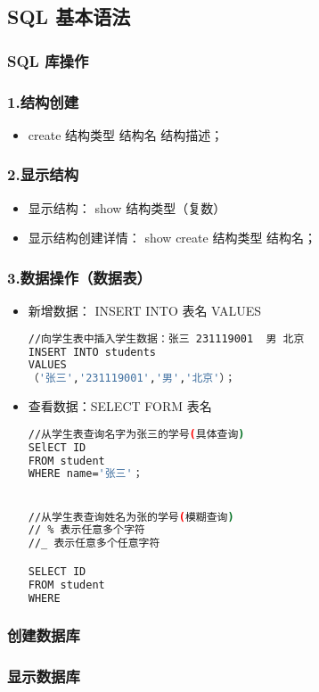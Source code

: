 
\begin{issues}
\issueDraft
\end{issues}

\subsection{SQL 基本语法}

\subsubsection{SQL 库操作}
\subsubsection{1.结构创建}
\begin{itemize}
\item create 结构类型 结构名 结构描述；
\end{itemize}
\subsubsection{2.显示结构}
\begin{itemize}
\item 显示结构： show 结构类型（复数）
\item 显示结构创建详情： show create 结构类型 结构名；
\end{itemize}
\subsubsection{3.数据操作（数据表）}
\begin{itemize}
\item 新增数据： INSERT INTO 表名 VALUES
\begin{lstlisting}[language=bash]
//向学生表中插入学生数据：张三 231119001  男 北京
INSERT INTO students
VALUES
（'张三','231119001','男','北京'）；
\end{lstlisting}

\item 查看数据：SELECT FORM 表名 
\begin{lstlisting}[language=bash]
//从学生表查询名字为张三的学号(具体查询)
SElECT ID
FROM student
WHERE name='张三'；


//从学生表查询姓名为张的学号(模糊查询)
// % 表示任意多个字符
//_ 表示任意多个任意字符

SELECT ID
FROM student
WHERE 

\end{lstlisting}
\end{itemize}


\subsubsection{创建数据库}
\subsubsection{显示数据库}
